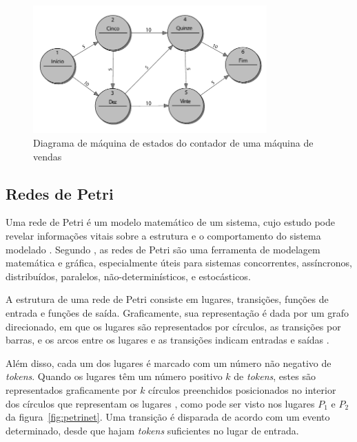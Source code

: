 \begin{figure}[ht]
	\caption{\label{fig:fsm_2}Diagrama de máquina de estados do contador de uma máquina de vendas}
	\begin{center}
	    \includegraphics[width=0.8\textwidth]{resources/fsm_wagner}
	\end{center}
\end{figure}


\subsection{Redes de Petri}
Uma rede de Petri é um modelo matemático de um sistema, cujo estudo pode revelar informações vitais sobre a estrutura e o comportamento do sistema modelado \cite{peterson:1981}. Segundo , as redes de Petri são uma ferramenta de modelagem matemática e gráfica, especialmente úteis para sistemas concorrentes, assíncronos, distribuídos, paralelos, não-determinísticos, e estocásticos.

A estrutura de uma rede de Petri consiste em lugares, transições, funções de entrada e funções de saída. Graficamente, sua representação é dada por um grafo direcionado, em que os lugares são representados por círculos, as transições por barras, e os arcos entre os lugares e as transições indicam entradas e saídas \cite{peterson:1981}. %

Além disso, cada um dos lugares é marcado com um número não negativo de \textit{tokens}. Quando os lugares têm um número positivo $k$ de \textit{tokens}, estes são representados graficamente por $k$ círculos preenchidos posicionados no interior dos círculos que representam os lugares \cite{murata:1989}, como pode ser visto nos lugares $P_1$ e $P_2$ da figura~\ref{fig:petrinet}. Uma transição é disparada de acordo com um evento determinado, desde que hajam \textit{tokens} suficientes no lugar de entrada.

